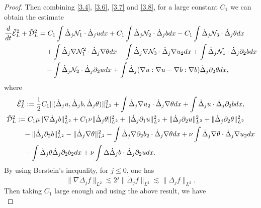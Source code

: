 \documentclass[10pt,a4paper]{amsart}
\numberwithin{equation}{section}
\begin{document}
\begin{proof}
Then combining \eqref{3.4}, \eqref{3.6}, \eqref{3.7} and \eqref{3.8}, for a large
constant $C_1$ we can obtain the estimate
\begin{equation}\label{3.9}
\begin{aligned}
\frac{\rm d}{{\rm d}t}\tilde{\mathcal{E}}_L^2+\tilde{\mathcal{D}}_L^2
&=C_1\int\dot{\Delta}_j \mathcal{N}_1\cdot \dot{\Delta}_ju{\rm d}x+C_1\int\dot{\Delta}_j \mathcal{N}_2\cdot \dot{\Delta}_jb{\rm d}x-C_1\int\dot{\Delta}_j \mathcal{N}_3\cdot \dot{\Delta}_j\theta{\rm d}x \\
&\quad +\int\dot{\Delta}_j\nabla \mathcal{N}_1^2\cdot\dot{\Delta}_j\nabla\theta{\rm d}x-\int\dot{\Delta}_j\nabla\mathcal{N}_3\cdot\dot{\Delta}_j\nabla u_2{\rm d}x+\int\dot{\Delta}_j \mathcal{N}_1\cdot\dot{\Delta}_j\partial_2b{\rm d}x \\
&\quad -\int\dot{\Delta}_j\mathcal{N}_2\cdot\dot{\Delta}_j\partial_2 u{\rm d}x+\int\dot{\Delta}_j(\nabla u:\nabla u-\nabla b:\nabla b)\dot{\Delta}_j\partial_2\theta{\rm d}x,
\end{aligned}
\end{equation}
 where
 \begin{gather*}
 \tilde{\mathcal{E}}_L^2:=\frac{1}{2}C_1\|(\dot{\Delta}_ju,\dot{\Delta}_jb,
 \dot{\Delta}_j\theta)\|_{L^2}^2+\int\dot{\Delta}_j\nabla u_2\cdot\dot{\Delta}_j
 \nabla\theta{\rm d}x
 +\int\dot{\Delta}_j u\cdot\dot{\Delta}_j\partial_2b{\rm d}x,\\
\begin{aligned}
\tilde{\mathcal{D}}_L^2
&:= C_1\mu\|\nabla\dot{\Delta}_jb\|_{L^2}^2+C_1\nu\|\dot{\Delta}_j\theta\|_{L^2}^2+\|\dot{\Delta}_j\partial_1 u\|_{L^2}^2+\|\dot{\Delta}_j\partial_2 u\|_{L^2}^2+\|\dot{\Delta}_j\partial_2\theta\|_{L^2}^2 \\
&\quad -\|\dot{\Delta}_j\partial_2b\|_{L^2}^2-\|\dot{\Delta}_j\nabla \theta\|_{L^2}^2
 -\int\dot{\Delta}_j\nabla\partial_2b_2\cdot\dot{\Delta}_j\nabla\theta{\rm d}x
 +\nu\int\dot{\Delta}_j\nabla\theta\cdot\dot{\Delta}_j\nabla u_2{\rm d}x \\
&\quad -\int\dot{\Delta}_j\theta\dot{\Delta}_j\partial_2b_2{\rm d}x
 +\nu\int\Delta\dot{\Delta}_jb\cdot\dot{\Delta}_j\partial_2 u{\rm d}x.
\end{aligned}
\end{gather*}
By using Berstein's inequality, for $j\leqslant 0$, one has
\[
 \|\nabla\dot{\Delta}_jf\|_{L^2}\lesssim2^j\|\dot{\Delta}_jf\|_{L^2}
 \lesssim\|\dot{\Delta}_jf\|_{L^2}.
\]
Then taking $C_1$ large enough and using the above result, we have
 \begin{equation}\label{3.10}

\end{equation}
\end{proof}
\end{document}
